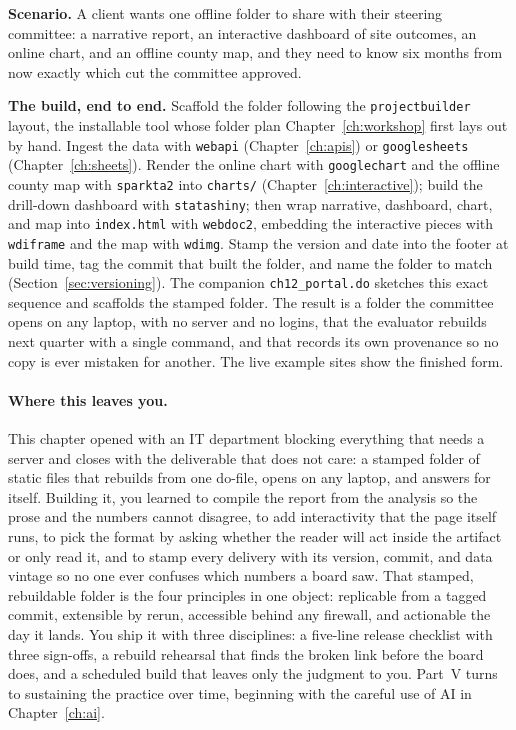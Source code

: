 \begin{appliedexample}\label{ae:ch12-onefolder}
\textbf{Scenario.} A client wants one offline folder to share with their steering committee: a narrative report, an interactive dashboard of site outcomes, an online chart, and an offline county map, and they need to know six months from now exactly which cut the committee approved.

\medskip
\textbf{The build, end to end.} Scaffold the folder following the \texttt{projectbuilder} layout, the installable tool whose folder plan Chapter~\ref{ch:workshop} first lays out by hand. Ingest the data with \texttt{webapi} (Chapter~\ref{ch:apis}) or \texttt{googlesheets} (Chapter~\ref{ch:sheets}). Render the online chart with \texttt{googlechart} and the offline county map with \texttt{sparkta2} into \texttt{charts/} (Chapter~\ref{ch:interactive}); build the drill-down dashboard with \texttt{statashiny}; then wrap narrative, dashboard, chart, and map into \texttt{index.html} with \texttt{webdoc2}, embedding the interactive pieces with \texttt{wdiframe} and the map with \texttt{wdimg}. Stamp the version and date into the footer at build time, tag the commit that built the folder, and name the folder to match (Section~\ref{sec:versioning}). The companion \texttt{ch12\_portal.do} sketches this exact sequence and scaffolds the stamped folder. The result is a folder the committee opens on any laptop, with no server and no logins, that the evaluator rebuilds next quarter with a single command, and that records its own provenance so no copy is ever mistaken for another. The live example sites show the finished form.
\end{appliedexample}

\paragraph{Where this leaves you.} This chapter opened with an IT department blocking everything that needs a server and closes with the deliverable that does not care: a stamped folder of static files that rebuilds from one do-file, opens on any laptop, and answers for itself. Building it, you learned to compile the report from the analysis so the prose and the numbers cannot disagree, to add interactivity that the page itself runs, to pick the format by asking whether the reader will act inside the artifact or only read it, and to stamp every delivery with its version, commit, and data vintage so no one ever confuses which numbers a board saw. That stamped, rebuildable folder is the four principles in one object: replicable from a tagged commit, extensible by rerun, accessible behind any firewall, and actionable the day it lands. You ship it with three disciplines: a five-line release checklist with three sign-offs, a rebuild rehearsal that finds the broken link before the board does, and a scheduled build that leaves only the judgment to you. Part~V turns to sustaining the practice over time, beginning with the careful use of AI in Chapter~\ref{ch:ai}.

